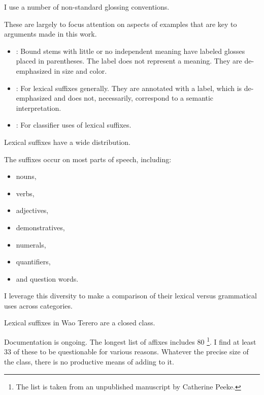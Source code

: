 \documentclass{beamer}
\begin{document}
\begin{frame}{I use a number of non-standard glossing conventions.}

  These are largely to focus attention on aspects of examples that are key to arguments made in this work.

  \begin{itemize}
  \item {}: Bound stems with little or no independent meaning have labeled glosses placed in parentheses. The label does not represent a meaning. They are de-emphasized in size and color.
  \item {}: For lexical suffixes generally. They are annotated with a label, which is de-emphasized and does not, necessarily, correspond to a semantic interpretation.
  \item {}: For classifier uses of lexical suffixes.
  \end{itemize}
  
\end{frame}

\begin{frame}{Lexical suffixes have a wide distribution.}

  The suffixes occur on most parts of speech, including:

  \begin{itemize}
  \item nouns,
  \item verbs,
  \item adjectives,
  \item demonstratives,
  \item numerals,
  \item quantifiers,
  \item and question words.
  \end{itemize}

  \vfill
  
  I leverage this diversity to make a comparison of their lexical versus grammatical uses across categories.
  
\end{frame}

\begin{frame}{Lexical suffixes in Wao Terero are a closed class.}

  Documentation is ongoing. The longest list of affixes includes 80 \citep{Fiddler2011}\footnote{The list is taken from an unpublished manuscript by Catherine Peeke.}.
  I find at least 33 of these to be questionable for various reasons.
  Whatever the precise size of the class, there is no productive means of adding to it.

\end{frame}
\end{document}
